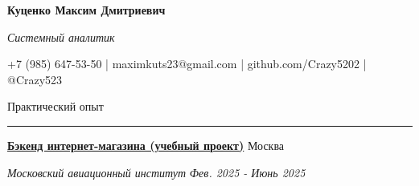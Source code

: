 \documentclass[14pt, a4paper, oneside]{extarticle}
\begin{document}



\begin{center}
    \textbf{\LARGE Куценко Максим Дмитриевич}
    
    \textit{\Large Системный аналитик}
\end{center}

\begin{center}
	\vspace{-0.5\intextsep}
	\small
    \faPhone* \space +7 (985) 647-53-50 | \faEnvelope \space maximkuts23@gmail.com | \faGithub \space github.com/Crazy5202 | \faTelegram \space @Crazy523
\end{center}


\begin{flushleft}
	\vspace{-\intextsep}
	\large Практический опыт
\end{flushleft}

\vspace{-0.8\intextsep}
\hrule


\begin{flushleft}
	\vspace{-0.8\intextsep}
	\quad
	\href{https://github.com/Crazy5202/eComm}{\textbf{Бэкенд интернет-магазина (учебный проект)}}
	\hfill
	Москва
\end{flushleft}

\begin{flushleft}
	\vspace{-1\intextsep}
	\quad
	\textit{Московский авиационный институт}
	\hfill
	\textit{\small Фев. 2025 - Июнь 2025}
\end{flushleft}

\end{document}
